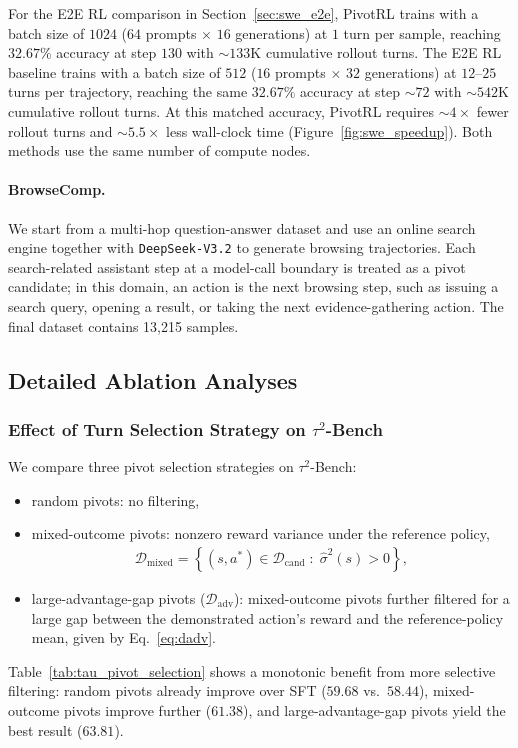 For the E2E RL comparison in Section~\ref{sec:swe_e2e}, PivotRL trains with a batch size of $1024$ ($64$ prompts $\times$ $16$ generations) at $1$ turn per sample, reaching $32.67\%$ accuracy at step $130$ with ${\sim}133$K cumulative rollout turns. The E2E RL baseline trains with a batch size of $512$ ($16$ prompts $\times$ $32$ generations) at $12$--$25$ turns per trajectory, reaching the same $32.67\%$ accuracy at step ${\sim}72$ with ${\sim}542$K cumulative rollout turns. At this matched accuracy, PivotRL requires ${\sim}4\times$ fewer rollout turns and ${\sim}5.5\times$ less wall-clock time (Figure~\ref{fig:swe_speedup}). Both methods use the same number of compute nodes.

\paragraph{BrowseComp.}
We start from a multi-hop question-answer dataset and use an online search engine together with \texttt{DeepSeek-V3.2} to generate browsing trajectories. Each search-related assistant step at a model-call boundary is treated as a pivot candidate; in this domain, an action is the next browsing step, such as issuing a search query, opening a result, or taking the next evidence-gathering action. The final dataset contains 13{,}215 samples.

\subsection{Detailed Ablation Analyses}
\label{app:detailed_ablations}

\subsubsection{Effect of Turn Selection Strategy on $\tau^2$-Bench}
\label{app:pivot_selection}

We compare three pivot selection strategies on $\tau^2$-Bench:
\begin{itemize}
    \item random pivots: no filtering,
    \item mixed-outcome pivots: nonzero reward variance under the reference policy,
    \begin{align}
        \mathcal{D}_{\mathrm{mixed}}
        =
        \left\{
        (s,a^*)\in \mathcal{D}_{\mathrm{cand}}
        \;:\;
        \hat{\sigma}^2(s)>0
        \right\},
        \label{eq:dmixed}
    \end{align}
    \item large-advantage-gap pivots ($\mathcal{D}_{\mathrm{adv}}$): mixed-outcome pivots further filtered for a large gap between the demonstrated action's reward and the reference-policy mean, given by Eq.~\eqref{eq:dadv}.
\end{itemize}
Table~\ref{tab:tau_pivot_selection} shows a monotonic benefit from more selective filtering: random pivots already improve over SFT ($59.68$ vs.\ $58.44$), mixed-outcome pivots improve further ($61.38$), and large-advantage-gap pivots yield the best result ($63.81$).

